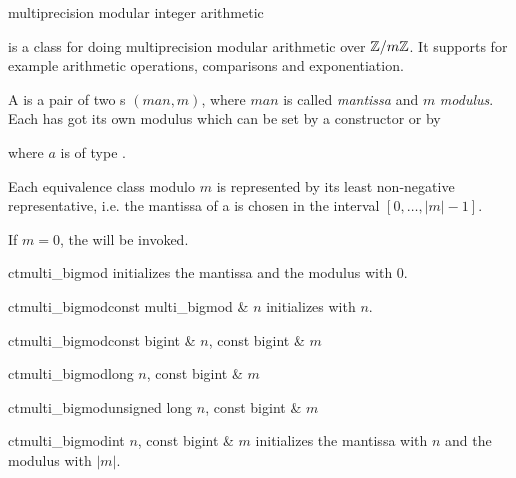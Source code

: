 

\NAME

 \dotfill multiprecision modular integer arithmetic



\ABSTRACT

 is a class for doing multiprecision modular arithmetic over $\mathbb{Z}/m\mathbb{Z}$.  It
supports for example arithmetic operations, comparisons and exponentiation.



\DESCRIPTION

A  is a pair of two s $(\mathit{man}, m)$, where $\mathit{man}$
is called \emph{mantissa} and $m$ \emph{modulus}.  Each  has got its own
modulus which can be set by a constructor or by
\begin{quote}
\end{quote}
where $a$ is of type .

Each equivalence class modulo $m$ is represented by its least non-negative representative, i.e.
the mantissa of a  is chosen in the interval $[ 0, \dots, |m|-1 ]$.



\CONS

If $m = 0$, the \LEH will be invoked.

\begin{fcode}{ct}{multi_bigmod}{}
  initializes the mantissa and the modulus with 0.
\end{fcode}

\begin{fcode}{ct}{multi_bigmod}{const multi_bigmod & $n$}
  initializes with $n$.
\end{fcode}

\begin{fcode}{ct}{multi_bigmod}{const bigint & $n$, const bigint & $m$}\end{fcode}
\begin{fcode}{ct}{multi_bigmod}{long $n$, const bigint & $m$}\end{fcode}
\begin{fcode}{ct}{multi_bigmod}{unsigned long $n$, const bigint & $m$}\end{fcode}
\begin{fcode}{ct}{multi_bigmod}{int $n$, const bigint & $m$}
  initializes the mantissa with $n$ and the modulus with $|m|$.
\end{fcode}

